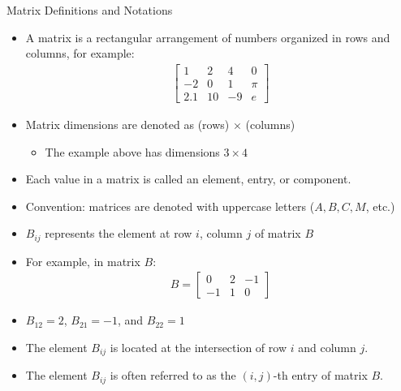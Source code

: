 \begin{frame}{Matrix Definitions and Notations}
\begin{itemize}
    \item A matrix is a rectangular arrangement of numbers organized in rows and columns, for example:
        \begin{align*}
            \begin{bmatrix}
                1 & 2 & 4 & 0\\
                -2 & 0 & 1 & \pi \\
                2.1 & 10 & -9 & e
            \end{bmatrix}
        \end{align*}
    \item Matrix dimensions are denoted as (rows) $\times$ (columns)
        \begin{itemize}
            \item The example above has dimensions $3\times 4$
        \end{itemize}
    \item Each value in a matrix is called an element, entry, or component.
\end{itemize}
\end{frame}
\begin{frame}
    \begin{itemize}
        \item Convention: matrices are denoted with uppercase letters ($A, B, C, M$, etc.)
        
        \item $B_{ij}$ represents the element at row $i$, column $j$ of matrix $B$
        \item For example, in matrix $B$:
        \begin{align*}
            B = \begin{bmatrix}
                0 & 2 & -1\\
                -1 & 1 & 0 
            \end{bmatrix}
        \end{align*}
        \item $B_{12} = 2$, $B_{21} = -1$, and $B_{22} = 1$
        \item The element $B_{ij}$ is located at the intersection of row $i$ and column $j$.
        \item The element $B_{ij}$ is often referred to as the $(i,j)$-th entry of matrix $B$.
    \end{itemize}
\end{frame}

